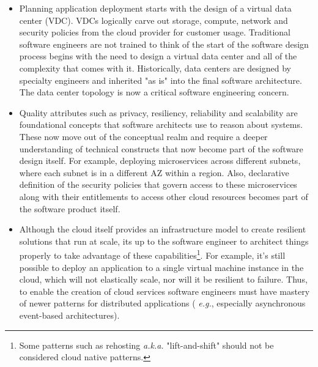 \documentclass[conference]{IEEEconf}
\begin{document}
\begin{itemize}
	\item \vspace{-0.2cm} Planning application deployment starts with the design of a virtual data center (VDC). VDCs logically carve out storage, compute, network and security policies from the cloud provider for customer usage. Traditional software engineers are not trained to think of the start of the software design process begins with the need to design a virtual data center and all of the complexity that comes with it.  Historically, data centers are designed by specialty engineers and inherited "as is" into the final software architecture. The data center topology is now a critical software engineering concern. 
	
	\item \vspace{-0.2cm} Quality attributes such as privacy, resiliency, reliability and scalability are foundational concepts that software architects use to reason about systems.  These now move out of the conceptual realm and require a deeper understanding of technical constructs that now become part of the software design itself.  For example, deploying microservices across different subnets, where each subnet is in a different AZ within a region. Also, declarative definition of  the security policies that govern access to these microservices along with their entitlements to access other cloud resources becomes part of the software product itself. 
	
	\item \vspace{-0.2cm} Although the cloud itself provides an infrastructure model to create resilient solutions that run at scale, its up to the software engineer to architect things properly to take advantage of these capabilities\footnote{Some patterns such as rehosting\cite{engelsrud2019moving} {\em a.k.a.} "lift-and-shift" should not be considered cloud native patterns.}.  For example, it's still possible to deploy an application to a single virtual machine instance in the cloud, which will not elastically scale, nor will it be resilient to failure.  Thus, to enable the creation of cloud services software engineers must have mastery of newer patterns for distributed applications ( {\em e.g.}, especially asynchronous event-based architectures).
	

\end{itemize}
\end{document}

